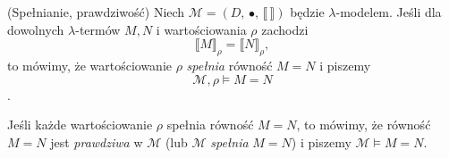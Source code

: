   \begin{definicja}(Spełnianie, prawdziwość)
    Niech \(\mathcal{M}=(D,\,\bullet,\,\llbracket\,\rrbracket)\) będzie \(\lambda\)-modelem.
    Jeśli dla dowolnych \(\lambda\)-termów \(M, N\) i wartościowania \(\rho\) zachodzi
    \[
      \llbracket M \rrbracket_\rho = \llbracket N \rrbracket_\rho,
    \]
    to mówimy, że wartościowanie \(\rho\) \emph{spełnia} równość \(M=N\) i piszemy \[\mathcal{M},\rho\models M=N\].

    Jeśli każde wartościowanie \(\rho\) spełnia równość \(M=N\), to mówimy, że równość \(M=N\) jest \emph{prawdziwa} w \(\mathcal{M}\) (lub \(\mathcal{M}\) \emph{spełnia} \(M=N\)) i piszemy \(\mathcal{M}\models M=N\).
  \end{definicja}



